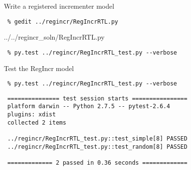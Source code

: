 \begin{task}\begin{frame}[fragile]{Write a registered incrementer model}

\vspace{-0.15in}
\begin{Verbatim}[commandchars=\\\{\}]
 % cd    \midtilde/pymtl-tut/build
 % gedit ../regincr/RegIncrRTL.py
\end{Verbatim}
\vspace{-0.2in}

%
{../../regincr_soln/RegIncrRTL.py}

\vspace{-0.22in}
\begin{Verbatim}
 % py.test ../regincr/RegIncrRTL_test.py --verbose
\end{Verbatim}

\vspace{-2.5in}\hspace*{2.4in}

\end{frame}
\end{task}

\begin{task}\begin{frame}[fragile]{Test the RegIncr model}

\vspace{-0.15in}
\begin{Verbatim}[commandchars=\\\{\}]
 % cd    \midtilde/pymtl-tut/build
 % py.test ../regincr/RegIncrRTL_test.py --verbose
\end{Verbatim}
\smallskip
\begin{Verbatim}
 =============== test session starts ================
 platform darwin -- Python 2.7.5 -- pytest-2.6.4
 plugins: xdist
 collected 2 items

 ../regincr/RegIncrRTL_test.py::test_simple[8] PASSED
 ../regincr/RegIncrRTL_test.py::test_random[8] PASSED

 ============= 2 passed in 0.36 seconds =============
\end{Verbatim}

\end{frame}
\end{task}

